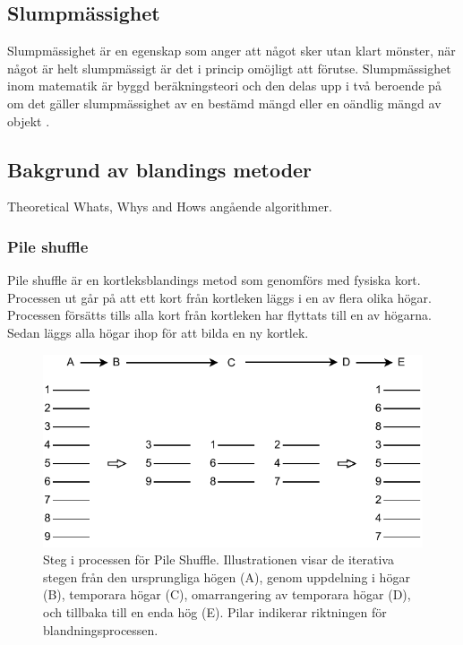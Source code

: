 \documentclass[swedish,a4paper]{article}
\begin{document}
\subsection{Slumpmässighet}

Slumpmässighet är en egenskap som anger att något sker utan klart mönster, när
något är helt slumpmässigt är det i princip omöjligt att förutse. Slumpmässighet
inom matematik är byggd beräknings\-teori och den delas upp i två beroende på om
det gäller slumpmässighet av en bestämd mängd eller en oändlig mängd av objekt
\parencite[49-66]{Terwijn2016}.

\subsection{Bakgrund av blandings metoder}
Theoretical Whats, Whys and Hows angående algorithmer.

\subsubsection{Pile shuffle}
\label{sec:pile_shuffle}
Pile shuffle är en kortleksblandings metod som genomförs med fysiska kort. Processen ut går på att ett kort
från kortleken läggs i en av flera olika högar. Processen försätts tills alla kort från kortleken har flyttats till en av högarna. Sedan läggs alla högar ihop för att bilda en ny kortlek. 


\begin{figure}[H]
	\begin{center}
		\includegraphics{images/pile_shuffle.pdf}
	\end{center}
	\captionsetup{justification=centering,margin=4cm}
	\caption{Steg i processen för Pile Shuffle. Illustrationen visar de
	iterativa stegen från den ursprungliga högen (A), genom uppdelning i
	högar (B), temporara högar (C), omarrangering av temporara högar (D),
	och tillbaka till en enda hög (E). Pilar indikerar riktningen för
	blandningsprocessen.
	}
	\label{fig:pile_shuffle_1}
\end{figure}
\end{document}
